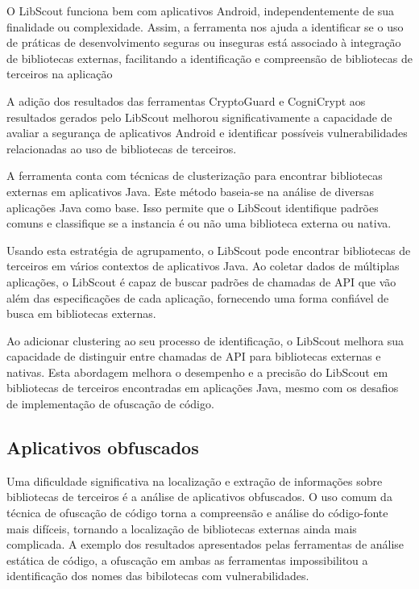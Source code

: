O LibScout funciona bem com aplicativos Android, independentemente de sua finalidade ou complexidade. Assim, a ferramenta nos ajuda a identificar se o uso de práticas de desenvolvimento seguras ou inseguras está associado à integração de bibliotecas externas, facilitando a identificação e compreensão de bibliotecas de terceiros na aplicação

A adição dos resultados das ferramentas CryptoGuard e CogniCrypt aos resultados gerados pelo LibScout melhorou significativamente a capacidade de avaliar a segurança de aplicativos Android e identificar possíveis vulnerabilidades relacionadas ao uso de bibliotecas de terceiros.

A ferramenta conta com técnicas de clusterização para encontrar bibliotecas externas em aplicativos Java. Este método baseia-se na análise de diversas aplicações Java como base. Isso permite que o LibScout identifique padrões comuns e classifique se a instancia é ou não uma biblioteca externa ou nativa.

Usando esta estratégia de agrupamento, o LibScout pode encontrar bibliotecas de terceiros em vários contextos de aplicativos Java. Ao coletar dados de múltiplas aplicações, o LibScout é capaz de buscar padrões de chamadas de API que vão além das especificações de cada aplicação, fornecendo uma forma confiável de busca em bibliotecas externas.

Ao adicionar clustering ao seu processo de identificação, o LibScout melhora sua capacidade de distinguir entre chamadas de API para bibliotecas externas e nativas. Esta abordagem melhora o desempenho e a precisão do LibScout em bibliotecas de terceiros encontradas em aplicações Java, mesmo com os desafios de implementação de ofuscação de código.

\subsection{Aplicativos obfuscados} %

Uma dificuldade significativa na localização e extração de informações sobre bibliotecas de terceiros é a análise de aplicativos obfuscados. O uso comum da técnica de ofuscação de código torna a compreensão e análise do código-fonte mais difíceis, tornando a localização de bibliotecas externas ainda mais complicada. A exemplo dos resultados apresentados pelas ferramentas de análise estática de código, a ofuscação em ambas as ferramentas impossibilitou a identificação dos nomes das bibilotecas com vulnerabilidades.

